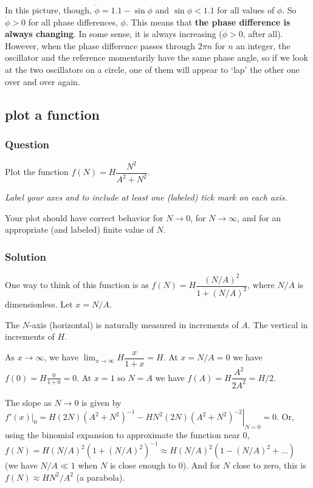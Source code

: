 \documentclass[12pt,letterpaper,noanswers]{exam}
\begin{document}
In this picture, though, $\dot\phi = 1.1 - \sin\phi$ and $\sin\phi < 1.1$ for all values of $\phi$.  So $\dot\phi > 0$ for all phase differences, $\phi$.  This means that \textbf{the phase difference is always changing}.  In some sense, it is always increasing ($\dot\phi>0$, after all).  However, when the phase difference passes through $2\pi n$ for $n$ an integer, the oscillator and the reference momentarily have the same phase angle, so if we look at the two oscillators on a circle, one of them will appear to `lap' the other one over and over again. 


\subsection{plot a function}
\subsubsection{Question}

Plot the function $f(N) = H\dfrac{N^2}{A^2+N^2}$.  

\emph{Label your axes and to include at least one (labeled) tick mark on each axis.}

Your plot should have correct behavior for $N\rightarrow 0$, for $N\rightarrow\infty$, and for an appropriate (and labeled) finite value of $N$.



\subsubsection{Solution}

One way to think of this function is as $f(N) = H \dfrac{(N/A)^2}{1+(N/A)^2}$, where $N/A$ is dimensionless.  Let $ x = N/A$.  

The $N$-axis (horizontal) is naturally measured in increments of $A$.  The vertical in increments of $H$.  

As $x\rightarrow \infty$, we have $\lim_{x\rightarrow \infty} H \dfrac{x}{1+x} = H$.  At $x = N/A = 0$ we have $f(0) = H\frac{0}{1+0} = 0$.  At $x = 1$ so $N = A$ we have $f(A) = H\dfrac{A^2}{2A^2} = H/2$.  

The slope as $N\rightarrow 0$ is given by $\left.f'(x)\right\vert_0 = \left.H(2N)(A^2+N^2)^{-1}-HN^2(2N)(A^2+N^2)^{-2}\right\vert_{N=0} = 0$.  Or, using the binomial expansion to approximate the function near $0$, $f(N)= H(N/A)^2(1+(N/A)^2)^{-1} \approx H(N/A)^2(1 - (N/A)^2 + ...)$ (we have $N/A \ll 1$ when $N$ is close enough to $0$).  And for $N$ close to zero, this is $f(N) \approx HN^2/A^2$ (a parabola).
\end{document}

